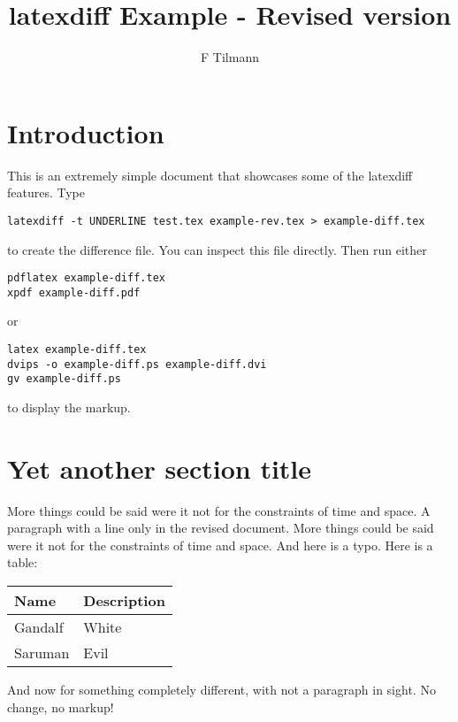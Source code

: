 \documentclass[12pt,a4paper]{article}
\title{latexdiff Example - Revised version}
\author{F Tilmann}
\begin{document}
\maketitle
\section*{Introduction}
This is an extremely simple document that showcases some of the latexdiff features.
Type
\begin{verbatim}
latexdiff -t UNDERLINE test.tex example-rev.tex > example-diff.tex
\end{verbatim}
to create the difference file. You can inspect this file directly. Then run either
\begin{verbatim}
pdflatex example-diff.tex
xpdf example-diff.pdf
\end{verbatim}
or
\begin{verbatim}
latex example-diff.tex
dvips -o example-diff.ps example-diff.dvi
gv example-diff.ps
\end{verbatim}
to display the markup.
\section*{Yet another section title}
More things could be said were it not for the constraints of time and space.
A paragraph with a line only in the revised document.
More things could be said were it not for the constraints of time and space.
And here is a typo.
Here is a table:
\begin{tabular}{ll}
Name & Description \\
\hline
Gandalf & White \\
Saruman & Evil
\end{tabular}
And now for something completely different, with not a paragraph in sight.
No change,
no markup!
\end{document}
